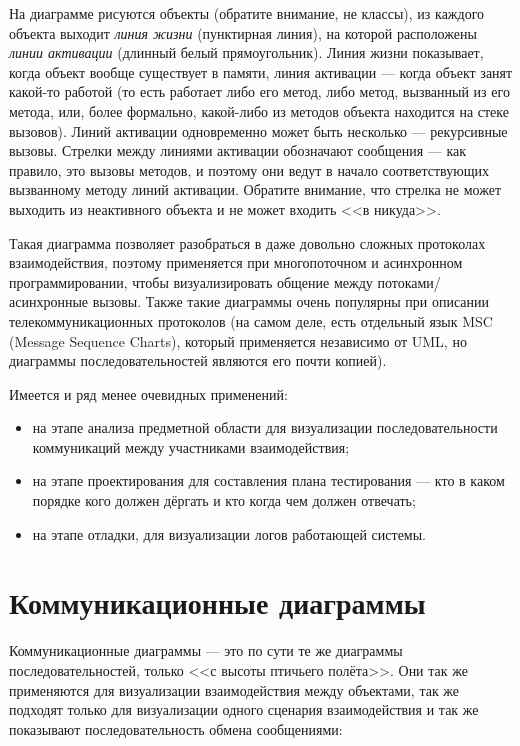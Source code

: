 \documentclass[a5paper]{article}
\begin{document}
На диаграмме рисуются объекты (обратите внимание, не классы), из каждого объекта выходит \textit{линия жизни} (пунктирная линия), на которой расположены \textit{линии активации} (длинный белый прямоугольник). Линия жизни показывает, когда объект вообще существует в памяти, линия активации --- когда объект занят какой-то работой (то есть работает либо его метод, либо метод, вызванный из его метода, или, более формально, какой-либо из методов объекта находится на стеке вызовов). Линий активации одновременно может быть несколько --- рекурсивные вызовы. Стрелки между линиями активации обозначают сообщения --- как правило, это вызовы методов, и поэтому они ведут в начало соответствующих вызванному методу линий активации. Обратите внимание, что стрелка не может выходить из неактивного объекта и не может входить <<в никуда>>.

Такая диаграмма позволяет разобраться в даже довольно сложных протоколах взаимодействия, поэтому применяется при многопоточном и асинхронном программировании, чтобы визуализировать общение между потоками/асинхронные вызовы. Также такие диаграммы очень популярны при описании телекоммуникационных протоколов (на самом деле, есть отдельный язык MSC (Message Sequence Charts), который применяется независимо от UML, но диаграммы последовательностей являются его почти копией).

Имеется и ряд менее очевидных применений: 

\begin{itemize}
	\item на этапе анализа предметной области для визуализации последовательности коммуникаций между участниками взаимодействия;
	\item на этапе проектирования для составления плана тестирования --- кто в каком порядке кого должен дёргать и кто когда чем должен отвечать;
	\item на этапе отладки, для визуализации логов работающей системы.
\end{itemize}

\section{Коммуникационные диаграммы}

Коммуникационные диаграммы --- это по сути те же диаграммы последовательностей, только <<с высоты птичьего полёта>>. Они так же применяются для визуализации взаимодействия между объектами, так же подходят только для визуализации одного сценария взаимодействия и так же показывают последовательность обмена сообщениями:
\end{document}
